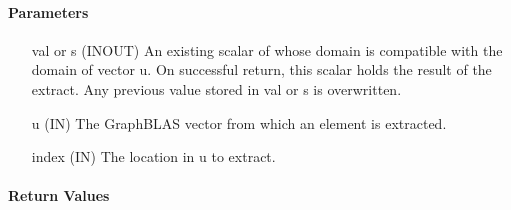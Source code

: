 \paragraph{Parameters}

\begin{itemize}[leftmargin=1in]
    \item[{\sf val} or {\sf s}]   ({\sf INOUT}) An existing scalar of whose domain is 
    compatible with the domain of vector {\sf u}. On successful return, this scalar 
    holds the result of the extract. Any previous value stored in {\sf val} or {\sf s} is 
    overwritten.

    \item[{\sf u}]     ({\sf IN}) The GraphBLAS vector from which an element
    is extracted.
    
    \item[{\sf index}] ({\sf IN}) The location in {\sf u} to extract.
\end{itemize}

\paragraph{Return Values}

